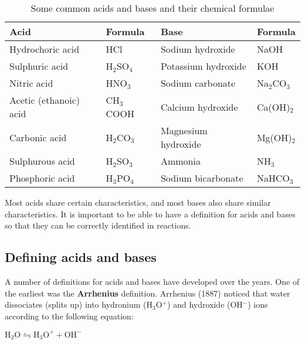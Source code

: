 \begin{table}[h]
\begin{center}
\caption{Some common acids and bases and their chemical formulae}
\label{tab:acids and bases}

\begin{tabular}{|l|l||l|l|}\hline
\textbf{Acid} & \textbf{Formula} & \textbf{Base} & \textbf{Formula}\\\hline\hline
Hydrochoric acid & HCl & Sodium hydroxide & NaOH \\\hline
Sulphuric acid & H$_{2}$SO$_{4}$ & Potassium hydroxide & KOH \\\hline
Nitric acid & HNO$_{3}$ & Sodium carbonate & Na$_{2}$CO$_{3}$\\\hline
Acetic (ethanoic) acid & CH$_{3}$COOH & Calcium hydroxide & Ca(OH)$_{2}$ \\\hline
Carbonic acid & H$_{2}$CO$_{3}$ & Magnesium hydroxide & Mg(OH)$_{2}$ \\\hline
Sulphurous acid & H$_{2}$SO$_{3}$ & Ammonia & NH$_{3}$ \\\hline
Phosphoric acid & H$_{3}$PO$_{4}$ & Sodium bicarbonate & NaHCO$_{3}$ \\\hline
\end{tabular}
\end{center}
\end{table}

Most acids share certain characteristics, and most bases also share similar characteristics. It is important to be able to have a definition for acids and bases so that they can be correctly identified in reactions.

\subsection{Defining acids and bases}

A number of definitions for acids and bases have developed over the years. One of the earliest was the \textbf{Arrhenius} definition. Arrhenius (1887) noticed that water dissociates (splits up) into hydronium (H$_{3}$O$^{+}$) and hydroxide (OH$^{-}$) ions according to the following equation:

\begin{center}
$\text{H}_{2}\text{O} \leftrightharpoons \text{H}_{3}\text{O}^{+} + \text{OH}^{-}$
\end{center}


